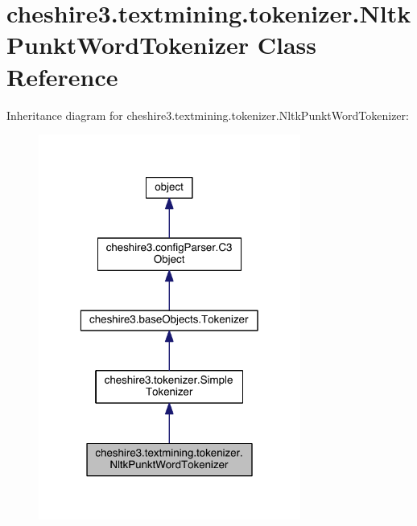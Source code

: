 \hypertarget{classcheshire3_1_1textmining_1_1tokenizer_1_1_nltk_punkt_word_tokenizer}{\section{cheshire3.\-textmining.\-tokenizer.\-Nltk\-Punkt\-Word\-Tokenizer Class Reference}
\label{classcheshire3_1_1textmining_1_1tokenizer_1_1_nltk_punkt_word_tokenizer}
}


Inheritance diagram for cheshire3.\-textmining.\-tokenizer.\-Nltk\-Punkt\-Word\-Tokenizer\-:
\nopagebreak
\begin{figure}[H]
\begin{center}
\leavevmode
\includegraphics[width=244pt]{classcheshire3_1_1textmining_1_1tokenizer_1_1_nltk_punkt_word_tokenizer__inherit__graph}
\end{center}
\end{figure}


